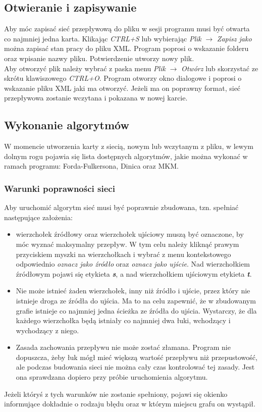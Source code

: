 \subsection{Otwieranie i zapisywanie}
Aby móc zapisać sieć przepływową do pliku w sesji programu musi być otwarta co najmniej jedna karta. Klikając \textit{CTRL+S} lub wybierając \textit{Plik} $ \rightarrow $ \textit{Zapisz jako} można zapisać stan pracy do pliku XML. Program poprosi o wskazanie folderu oraz wpisanie nazwy pliku. Potwierdzenie utworzy nowy plik.\\\indent
Aby otworzyć plik należy wybrać z paska menu \textit{Plik} $\rightarrow$ \textit{Otwórz} lub skorzystać ze skrótu klawiszowego \textit{CTRL+O}. Program otworzy okno dialogowe i poprosi o wskazanie pliku XML jaki ma otworzyć. Jeżeli ma on poprawny format, sieć przepływowa zostanie wczytana i pokazana w nowej karcie.
\subsection{Wykonanie algorytmów}
W momencie utworzenia karty z siecią, nowym lub wczytanym z pliku, w lewym dolnym rogu pojawia się lista dostępnych algorytmów, jakie można wykonać w ramach programu: Forda-Fulkersona, Dinica oraz MKM.
\subsubsection{Warunki poprawności sieci}
Aby uruchomić algorytm sieć musi być poprawnie zbudowana, tzn. spełniać następujące założenia:
\begin{itemize}
	\item wierzchołek źródłowy oraz wierzchołek ujściowy muszą być oznaczone, by móc wyznać maksymalny przepływ. W tym celu należy kliknąć prawym przyciskiem myszki na wierzchołkach i wybrać z menu kontekstowego odpowiednio \textit{oznacz jako źródło} oraz \textit{oznacz jako ujście}. Nad wierzchołkiem źródłowym pojawi się etykieta \textit{\textbf{s}}, a nad wierzchołkiem ujściowym etykieta \textit{\textbf{t}}.
	\item Nie może istnieć żaden wierzchołek, inny niż źródło i ujście, przez który nie istnieje droga ze źródła do ujścia. Ma to na celu zapewnić, że w zbudowanym grafie istnieje co najmniej jedna ścieżka ze źródła do ujścia. Wystarczy, że dla każdego wierzchołka będą istniały co najmniej dwa łuki, wchodzący i wychodzący z niego.
	\item Zasada zachowania przepływu nie może zostać złamana. Program nie dopuszcza, żeby łuk mógł mieć większą wartość przepływu niż przepustowość, ale podczas budowania sieci nie można cały czas kontrolować tej zasady. Jest ona sprawdzana dopiero przy próbie uruchomienia algorytmu.
\end{itemize}
Jeżeli któryś z tych warunków nie zostanie spełniony, pojawi się okienko informujące dokładnie o rodzaju błędu oraz w którym miejscu grafu on wystąpił.
